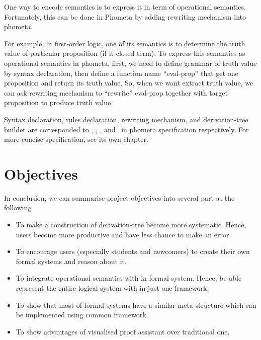 \documentclass[master.tex]{subfiles}
\begin{document}
One way to encode semantics is to express it in term of operational semantics. Fortunately, this can be done in Phometa by adding rewriting mechanism into phometa.

For example, in first-order logic, one of its semantics is to determine the truth value of particular proposition (if it closed term). To express this semantics as operational semantics in phometa, first, we need to define grammar of truth value by syntax declaration, then define a function name ``eval-prop'' that get one proposition and return its truth value. So, when we want extract truth value, we can ask rewriting mechanism to ``rewrite'' eval-prop together with target proposition to produce truth value.

Syntax declaration, rules declaration, rewriting mechanism, and derivation-tree builder are corresponded to \kGrammar, \kRule, \kDefinition, and \kTheorem\ in phometa specification respectively. For more concise specification, see its own chapter.

\section{Objectives}
In conclusion, we can summarise project objectives into several part as the following
\begin{itemize}
  \item To make a construction of derivation-tree become more systematic. Hence, users become more productive and have less chance to make an error.
  \item To encourage users (especially students and newcomers) to create their own formal systems and reason about it.
  \item To integrate operational semantics with in formal system. Hence, be able represent the entire logical system with in just one framework.
  \item To show that most of formal systems have a similar meta-structure which can be implemented using common framework.
  \item To show advantages of visualised proof assistant over traditional one.
\end{itemize}
\end{document}
